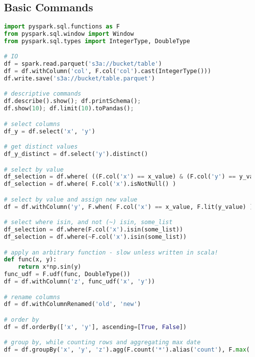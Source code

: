 \chapter{\pyspark}
\label{pyspark}

\section{Basic Commands}
\label{pyspark:basic}

\begin{lstlisting}[language=Python]
import pyspark.sql.functions as F
from pyspark.sql.window import Window
from pyspark.sql.types import IntegerType, DoubleType

# IO
df = spark.read.parquet('s3a://bucket/table')
df = df.withColumn('col', F.col('col').cast(IntegerType()))
df.write.save('s3a://bucket/table.parquet')

# descriptive commands
df.describe().show(); df.printSchema();
df.show(10); df.limit(10).toPandas();

# select columns
df_y = df.select('x', 'y')

# get distinct values
df_y_distinct = df.select('y').distinct()

# select by value
df_selection = df.where( ((F.col('x') == x_value) & (F.col('y') == y_value)) | (F.col('z') < z_value) )
df_selection = df.where( F.col('x').isNotNull() )

# select by value and assign new value
df = df.withColumn('y', F.when( F.col('x') == x_value, F.lit(y_value) ).otherwise(F.col('y')))

# select where isin, and not (~) isin, some_list
df_selection = df.where(F.col('x').isin(some_list))
df_selection = df.where(~F.col('x').isin(some_list))

# apply an arbitrary function - slow unless written in scala!
def func(x, y):
	return x*np.sin(y)
func_udf = F.udf(func, DoubleType())
df = df.withColumn('z', func_udf('x', 'y'))

# rename columns
df = df.withColumnRenamed('old', 'new')

# order by
df = df.orderBy(['x', 'y'], ascending=[True, False])

# group by, while counting rows and aggregating max date
df = df.groupBy('x', 'y', 'z').agg(F.count('*').alias('count'), F.max('date_col').alias('max_date'))


\end{lstlisting}
